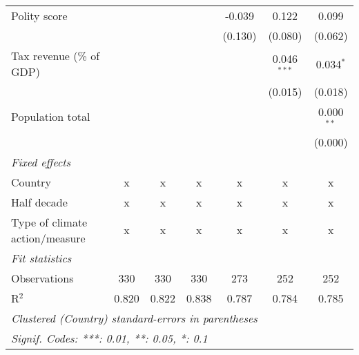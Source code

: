\begin{tabular}{lcccccc}
   Polity score                                                  &         &              &                & -0.039         & 0.122          & 0.099\\   
                                                                 &         &              &                & (0.130)        & (0.080)        & (0.062)\\   
   Tax revenue (\% of GDP)                                       &         &              &                &                & 0.046$^{***}$  & 0.034$^{*}$\\   
                                                                 &         &              &                &                & (0.015)        & (0.018)\\   
   Population total                                              &         &              &                &                &                & 0.000$^{**}$\\   
                                                                 &         &              &                &                &                & (0.000)\\   
   \emph{Fixed effects}\\
   Country                                                       & x       & x            & x              & x              & x              & x\\  
   Half decade                                                   & x       & x            & x              & x              & x              & x\\  
   Type of climate action/measure                                & x       & x            & x              & x              & x              & x\\  
   \midrule \emph{Fit statistics}\\
   Observations                                                  & 330     & 330          & 330            & 273            & 252            & 252\\  
   R$^2$                                                         & 0.820   & 0.822        & 0.838          & 0.787          & 0.784          & 0.785\\  
   \midrule
   \multicolumn{7}{l}{\emph{Clustered (Country) standard-errors in parentheses}}\\
   \multicolumn{7}{l}{\emph{Signif. Codes: ***: 0.01, **: 0.05, *: 0.1}}\\
\end{tabular}
\par\endgroup


